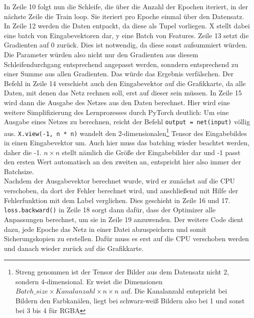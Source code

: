 \documentclass[11pt]{article}
\begin{document}
In Zeile 10 folgt nun die Schleife, die über die Anzahl der Epochen iteriert, in der nächste Zeile die Train loop. Sie iteriert pro Epoche einmal über den Datensatz. In Zeile 12 werden die Daten entpackt, da diese als Tupel vorliegen. X stellt dabei eine batch von Eingabevektoren dar, y eine Batch von Features. Zeile 13 setzt die Gradienten auf 0 zurück. Dies ist notwendig, da diese sonst aufsummiert würden. Die Parameter würden also nicht nur den Gradienten aus diesem Schleifendurchgang entsprechend angepasst werden, sonndern entsprechend zu einer Summe aus allen Gradienten. Das würde das Ergebnis verfälschen. Der Befehl in Zeile 14 verschiebt auch den Eingabevektor auf die Grafikkarte, da alle Daten, mit denen das Netz rechnen soll, erst auf dieser sein müssen. In Zeile 15 wird dann die Ausgabe des Netzes aus den Daten berechnet. Hier wird eine weitere Simplifizierung des Lernprozesses durch PyTorch deutlich: Um eine Ausgabe eines Netzes zu berechnen, reicht der Befehl \texttt{output = net(input)} völlig aus. \texttt{X.view(-1, n * n)} wandelt den 2-dimensionalen\footnote{Streng genommen ist der Tensor der Bilder aus dem Datensatz nicht 2, sondern 4-dimensional. Er weist die Dimensionen $Batch\_size\times Kanalanzahl\times n \times n$ auf. Die Kanalanzahl entspricht bei Bildern den Farbkanälen, liegt bei schwarz-weiß Bildern also bei 1 und sonst bei 3 bis 4 für RGBA} Tensor des Eingabebildes in einen Eingabevektor um. Auch hier muss das batching wieder beachtet werden, daher die -1. $n\times n$ stellt nämlich die Größe der Eingabebilder dar und -1 passt den ersten Wert automatisch an den zweiten an, entspricht hier also immer der Batchsize.\\
Nachdem der Ausgabevektor berechnet wurde, wird er zunächst auf die CPU verschoben, da dort der Fehler berechnet wird, und anschließend mit Hilfe der Fehlerfunktion mit dem Label verglichen. Dies geschieht in Zeile 16 und 17.\\ \texttt{loss.backward()} in Zeile 18 sorgt dann dafür, dass der Optimizer alle Anpassungen berechnet, um sie in Zeile 19 anzuwenden. Der weitere Code dient dazu, jede Epoche das Netz in einer Datei abzuspeichern und somit Sicherungskopien zu erstellen. Dafür muss es erst auf die CPU verschoben werden und danach wieder zurück auf die Grafikkarte.
\end{document}
